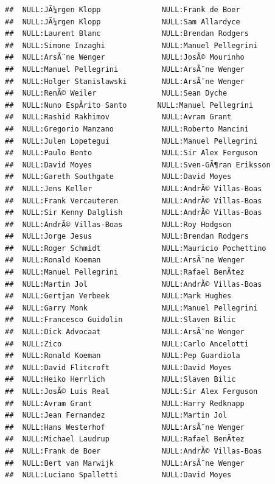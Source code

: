\documentclass{article}\usepackage[]{graphicx}\usepackage[]{color}
\makeatletter
\newenvironment{kframe}{%
 \def\at@end@of@kframe{}%
 \ifinner\ifhmode%
  \def\at@end@of@kframe{\end{minipage}}%
  \begin{minipage}{\columnwidth}%
 \fi\fi%
 \def\FrameCommand##1{\hskip\@totalleftmargin \hskip-\fboxsep
 \colorbox{shadecolor}{##1}\hskip-\fboxsep
     \hskip-\linewidth \hskip-\@totalleftmargin \hskip\columnwidth}%
 \MakeFramed {\advance\hsize-\width
   \@totalleftmargin\z@ \linewidth\hsize
   \@setminipage}}%
 {\par\unskip\endMakeFramed%
 \at@end@of@kframe}
\newenvironment{knitrout}{}{} %
\makeatother
\begin{document}
\begin{knitrout}
\begin{kframe}
\begin{verbatim}
##  NULL:JÃ¼rgen Klopp              NULL:Frank de Boer           
##  NULL:JÃ¼rgen Klopp              NULL:Sam Allardyce           
##  NULL:Laurent Blanc              NULL:Brendan Rodgers         
##  NULL:Simone Inzaghi             NULL:Manuel Pellegrini       
##  NULL:ArsÃ¨ne Wenger             NULL:JosÃ© Mourinho          
##  NULL:Manuel Pellegrini          NULL:ArsÃ¨ne Wenger          
##  NULL:Holger Stanislawski        NULL:ArsÃ¨ne Wenger          
##  NULL:RenÃ© Weiler               NULL:Sean Dyche              
##  NULL:Nuno EspÃ­rito Santo       NULL:Manuel Pellegrini       
##  NULL:Rashid Rakhimov            NULL:Avram Grant             
##  NULL:Gregorio Manzano           NULL:Roberto Mancini         
##  NULL:Julen Lopetegui            NULL:Manuel Pellegrini       
##  NULL:Paulo Bento                NULL:Sir Alex Ferguson       
##  NULL:David Moyes                NULL:Sven-GÃ¶ran Eriksson    
##  NULL:Gareth Southgate           NULL:David Moyes             
##  NULL:Jens Keller                NULL:AndrÃ© Villas-Boas      
##  NULL:Frank Vercauteren          NULL:AndrÃ© Villas-Boas      
##  NULL:Sir Kenny Dalglish         NULL:AndrÃ© Villas-Boas      
##  NULL:AndrÃ© Villas-Boas         NULL:Roy Hodgson             
##  NULL:Jorge Jesus                NULL:Brendan Rodgers         
##  NULL:Roger Schmidt              NULL:Mauricio Pochettino     
##  NULL:Ronald Koeman              NULL:ArsÃ¨ne Wenger          
##  NULL:Manuel Pellegrini          NULL:Rafael BenÃ­tez         
##  NULL:Martin Jol                 NULL:AndrÃ© Villas-Boas      
##  NULL:Gertjan Verbeek            NULL:Mark Hughes             
##  NULL:Garry Monk                 NULL:Manuel Pellegrini       
##  NULL:Francesco Guidolin         NULL:Slaven Bilic            
##  NULL:Dick Advocaat              NULL:ArsÃ¨ne Wenger          
##  NULL:Zico                       NULL:Carlo Ancelotti         
##  NULL:Ronald Koeman              NULL:Pep Guardiola           
##  NULL:David Flitcroft            NULL:David Moyes             
##  NULL:Heiko Herrlich             NULL:Slaven Bilic            
##  NULL:JosÃ© Luis Real            NULL:Sir Alex Ferguson       
##  NULL:Avram Grant                NULL:Harry Redknapp          
##  NULL:Jean Fernandez             NULL:Martin Jol              
##  NULL:Hans Westerhof             NULL:ArsÃ¨ne Wenger          
##  NULL:Michael Laudrup            NULL:Rafael BenÃ­tez         
##  NULL:Frank de Boer              NULL:AndrÃ© Villas-Boas      
##  NULL:Bert van Marwijk           NULL:ArsÃ¨ne Wenger          
##  NULL:Luciano Spalletti          NULL:David Moyes             

\end{verbatim}
\end{kframe}
\end{knitrout}
\end{document}
